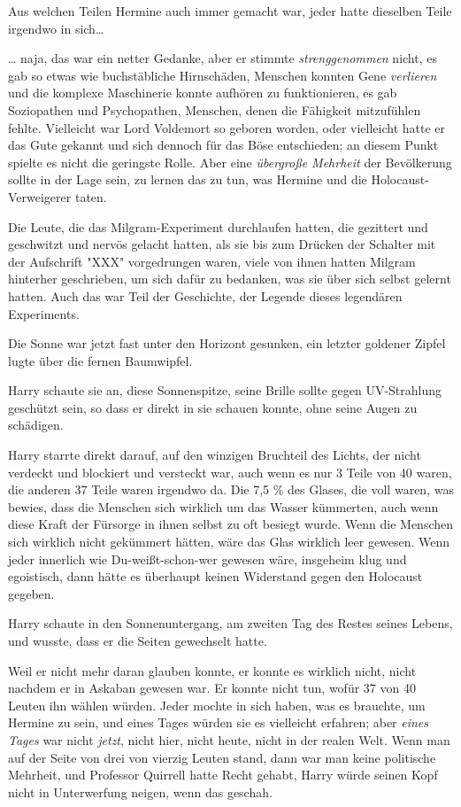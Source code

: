 {Aus welchen Teilen Hermine auch immer gemacht war, jeder hatte dieselben Teile irgendwo in sich…

… naja, das war ein netter Gedanke, aber er stimmte \emph{strenggenommen} nicht, es gab so etwas wie buchstäbliche Hirnschäden, Menschen konnten Gene \emph{verlieren} und die komplexe Maschinerie konnte aufhören zu funktionieren, es gab Soziopathen und Psychopathen, Menschen, denen die Fähigkeit mitzufühlen fehlte. Vielleicht war Lord Voldemort so geboren worden, oder vielleicht hatte er das Gute gekannt und sich dennoch für das Böse entschieden; an diesem Punkt spielte es nicht die geringste Rolle. Aber eine \emph{übergroße Mehrheit} der Bevölkerung sollte in der Lage sein, zu lernen das zu tun, was Hermine und die Holocaust-Verweigerer taten.

Die Leute, die das Milgram-Experiment durchlaufen hatten, die gezittert und geschwitzt und nervös gelacht hatten, als sie bis zum Drücken der Schalter mit der Aufschrift "XXX" vorgedrungen waren, viele von ihnen hatten Milgram hinterher geschrieben, um sich dafür zu bedanken, was sie über sich selbst gelernt hatten. Auch das war Teil der Geschichte, der Legende dieses legendären Experiments.

Die Sonne war jetzt fast unter den Horizont gesunken, ein letzter goldener Zipfel lugte über die fernen Baumwipfel.

Harry schaute sie an, diese Sonnenspitze, seine Brille sollte gegen UV-Strahlung geschützt sein, so dass er direkt in sie schauen konnte, ohne seine Augen zu schädigen.

Harry starrte direkt darauf, auf den winzigen Bruchteil des Lichts, der nicht verdeckt und blockiert und versteckt war, auch wenn es nur 3 Teile von 40 waren, die anderen 37 Teile waren irgendwo da. Die 7,5 \% des Glases, die voll waren, was bewies, dass die Menschen sich wirklich um das Wasser kümmerten, auch wenn diese Kraft der Fürsorge in ihnen selbst zu oft besiegt wurde. Wenn die Menschen sich wirklich nicht gekümmert hätten, wäre das Glas wirklich leer gewesen. Wenn jeder innerlich wie Du-weißt-schon-wer gewesen wäre, insgeheim klug und egoistisch, dann hätte es überhaupt keinen Widerstand gegen den Holocaust gegeben.

Harry schaute in den Sonnenuntergang, am zweiten Tag des Restes seines Lebens, und wusste, dass er die Seiten gewechselt hatte.

Weil er nicht mehr daran glauben konnte, er konnte es wirklich nicht, nicht nachdem er in Askaban gewesen war. Er konnte nicht tun, wofür 37 von 40 Leuten ihn wählen würden. Jeder mochte in sich haben, was es brauchte, um Hermine zu sein, und eines Tages würden sie es vielleicht erfahren; aber \emph{eines Tages} war nicht \emph{jetzt}, nicht hier, nicht heute, nicht in der realen Welt. Wenn man auf der Seite von drei von vierzig Leuten stand, dann war man keine politische Mehrheit, und Professor Quirrell hatte Recht gehabt, Harry würde seinen Kopf nicht in Unterwerfung neigen, wenn das geschah.

}
